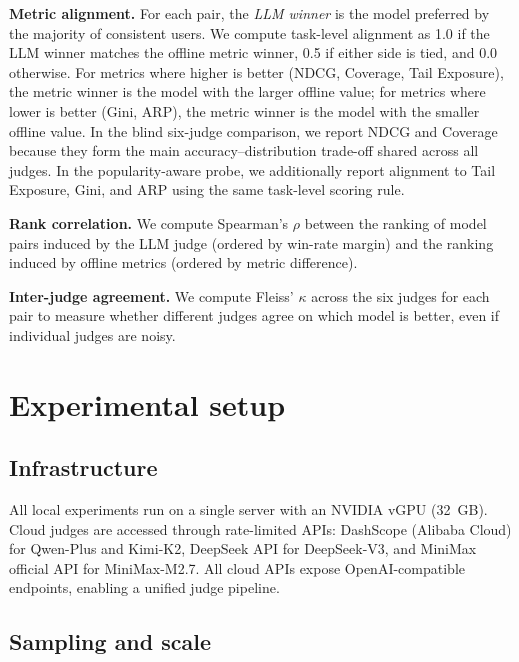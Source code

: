 \documentclass[pdflatex,sn-basic,referee,lineno]{sn-jnl}
\begin{document}
\noindent\textbf{Metric alignment.}  For each pair, the \emph{LLM winner} is the model preferred by the majority of consistent users. We compute task-level alignment as 1.0 if the LLM winner matches the offline metric winner, 0.5 if either side is tied, and 0.0 otherwise. For metrics where higher is better (NDCG, Coverage, Tail Exposure), the metric winner is the model with the larger offline value; for metrics where lower is better (Gini, ARP), the metric winner is the model with the smaller offline value. In the blind six-judge comparison, we report NDCG and Coverage because they form the main accuracy--distribution trade-off shared across all judges. In the popularity-aware probe, we additionally report alignment to Tail Exposure, Gini, and ARP using the same task-level scoring rule.

\noindent\textbf{Rank correlation.}  We compute Spearman's $\rho$ \citep{spearman1904proof} between the ranking of model pairs induced by the LLM judge (ordered by win-rate margin) and the ranking induced by offline metrics (ordered by metric difference).

\noindent\textbf{Inter-judge agreement.}  We compute Fleiss' $\kappa$ \citep{fleiss1971kappa} across the six judges for each pair to measure whether different judges agree on which model is better, even if individual judges are noisy.

\section{Experimental setup}
\label{sec:experimental_setup}

\subsection{Infrastructure}

All local experiments run on a single server with an NVIDIA vGPU (32~GB). Cloud judges are accessed through rate-limited APIs: DashScope (Alibaba Cloud) for Qwen-Plus and Kimi-K2, DeepSeek API for DeepSeek-V3, and MiniMax official API for MiniMax-M2.7. All cloud APIs expose OpenAI-compatible endpoints, enabling a unified judge pipeline.

\subsection{Sampling and scale}
\end{document}
